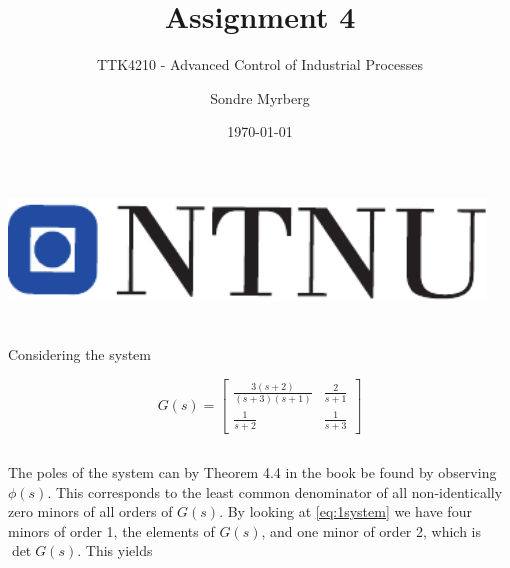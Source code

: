 \documentclass[a4paper]{scrartcl}
\title{Assignment 4}
\subtitle{TTK4210 - Advanced Control of Industrial Processes}
\author{Sondre Myrberg}
\date{\today}
\begin{document}
\hypersetup{pageanchor=false}
\begin{titlepage}
    \maketitle
    \vfill
    \vfill
    \vfill
    \vfill
    \vfill
    \includegraphics[width=0.95\textwidth]{../ntnu_logo.pdf}
    \vfill
    \vfill
\end{titlepage}
\hypersetup{pageanchor=true}

\section{}
Considering the system

\begin{equation}\label{eq:1system}
	G(s) = \begin{bmatrix}
		\frac{3(s+2)}{(s+3)(s+1)} & \frac{2}{s+1} \\
		\frac{1}{s+2} & \frac{1}{s+3}
	\end{bmatrix}
\end{equation}

\subsection{}
The poles of the system can by Theorem 4.4 in the book be found by observing $\phi(s)$. This corresponds to the least common denominator of all non-identically zero minors of all orders of $G(s)$. By looking at \eqref{eq:1system} we have four minors of order 1, the elements of $G(s)$, and one minor of order 2, which is $\det{G(s)}$. This yields
\end{document}
